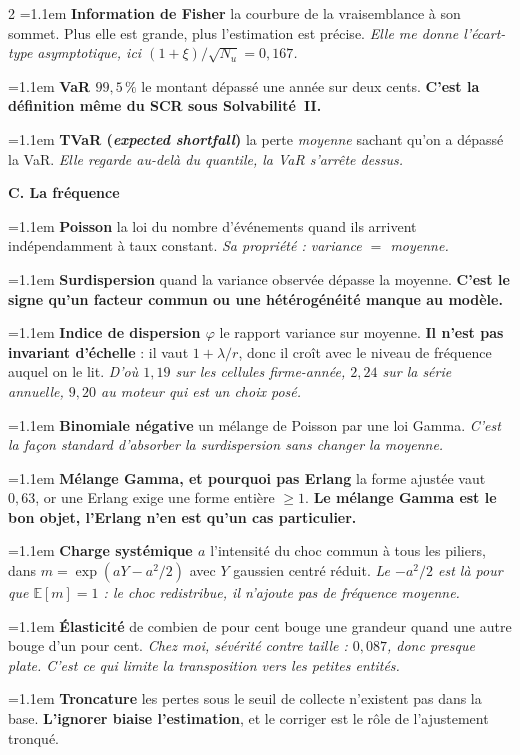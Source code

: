 \documentclass[9pt,a4paper]{article}
\newcommand{\n}[1]{\textbf{#1}}
\newcommand{\dfn}[2]{\noindent\hangindent=1.1em\hangafter=1
  {\color{warm}\bfseries #1} \textemdash{} #2\par\smallskip}
\begin{document}
\begin{multicols}{2}
\dfn{Information de Fisher}{la courbure de la vraisemblance à son sommet. Plus elle est
grande, plus l'estimation est précise. \emph{Elle me donne l'écart-type asymptotique, ici
$(1+\xi)/\sqrt{N_u}=0{,}167$.}}

\dfn{VaR $99{,}5\,\%$}{le montant dépassé une année sur deux cents. \n{C'est la définition
même du SCR sous Solvabilité~II.}}

\dfn{TVaR (\emph{expected shortfall})}{la perte \emph{moyenne} sachant qu'on a dépassé la
VaR. \emph{Elle regarde au-delà du quantile, la VaR s'arrête dessus.}}

\vspace{3pt}
{\color{navy}\bfseries C. La fréquence}

\dfn{Poisson}{la loi du nombre d'événements quand ils arrivent indépendamment à taux
constant. \emph{Sa propriété : variance $=$ moyenne.}}

\dfn{Surdispersion}{quand la variance observée dépasse la moyenne. \n{C'est le signe qu'un
facteur commun ou une hétérogénéité manque au modèle.}}

\dfn{Indice de dispersion $\varphi$}{le rapport variance sur moyenne. \n{Il n'est pas
invariant d'échelle} : il vaut $1+\lambda/r$, donc il croît avec le niveau de fréquence
auquel on le lit. \emph{D'où $1{,}19$ sur les cellules firme-année, $2{,}24$ sur la série
annuelle, $9{,}20$ au moteur qui est un choix posé.}}

\dfn{Binomiale négative}{un mélange de Poisson par une loi Gamma. \emph{C'est la façon
standard d'absorber la surdispersion sans changer la moyenne.}}

\dfn{Mélange Gamma, et pourquoi pas Erlang}{la forme ajustée vaut $0{,}63$, or une Erlang
exige une forme entière $\ge1$. \n{Le mélange Gamma est le bon objet, l'Erlang n'en est qu'un
cas particulier.}}

\dfn{Charge systémique $a$}{l'intensité du choc commun à tous les piliers, dans
$m=\exp(aY-a^2/2)$ avec $Y$ gaussien centré réduit. \emph{Le $-a^2/2$ est là pour que
$\mathbb{E}[m]=1$ : le choc redistribue, il n'ajoute pas de fréquence moyenne.}}

\dfn{Élasticité}{de combien de pour cent bouge une grandeur quand une autre bouge d'un pour
cent. \emph{Chez moi, sévérité contre taille : $0{,}087$, donc presque plate. C'est ce qui
limite la transposition vers les petites entités.}}

\dfn{Troncature}{les pertes sous le seuil de collecte n'existent pas dans la base.
\n{L'ignorer biaise l'estimation}, et le corriger est le rôle de l'ajustement tronqué.}


\end{multicols}
\end{document}
